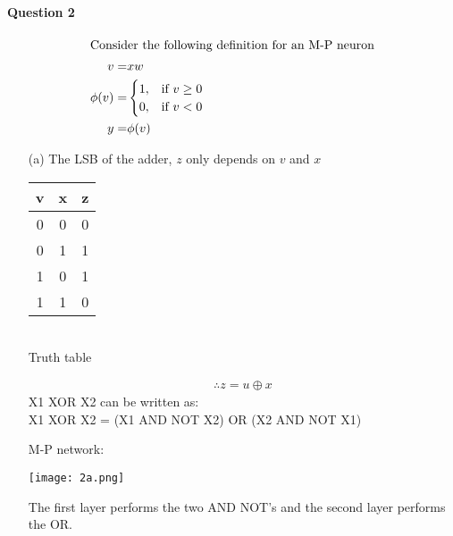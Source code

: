 \documentclass[12pt]{article}
\begin{document}
\paragraph{Question 2}
\begin{align*}
    \intertext{Consider the following definition for an M-P neuron}
    v = & xw \\
    \phi(v) = &
    \begin{cases}
    1, & \text{if $v\geq 0$} \\
    0, & \text{if $v<0$}
    \end{cases} \\
    y = & \phi(v) \\
\end{align*}
\begin{itemize}
    \item [(a)]
    The LSB of the adder, $z$ only depends on $v$ and $x$
    \begin{center}
    \begin{tabular}{| c | c | c |}
    \hline
    \textbf{v} & \textbf{x} & \textbf{z} \\ \hline
    0 & 0 & 0 \\ \hline
    0 & 1 & 1 \\ \hline
    1 & 0 & 1 \\ \hline
    1 & 1 & 0 \\ \hline
    \end{tabular} \\
    \bigskip
    Truth table
    \end{center}
    \begin{align*}
        \therefore z = u \oplus x
    \end{align*}
    X1 XOR X2 can be written as: \\
    X1 XOR X2 = (X1 AND NOT X2) OR (X2 AND NOT X1) 
    
    M-P network:
    \begin{center}
        \texttt{[image: 2a.png]}
    \end{center}
    The first layer performs the two AND NOT's and the second layer performs the OR.
    

\end{itemize}
\end{document}
